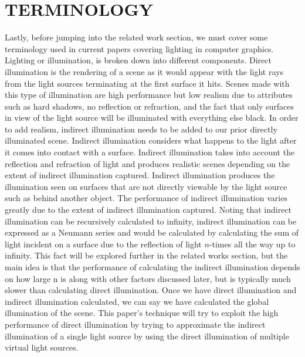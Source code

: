 \section{TERMINOLOGY}
Lastly, before jumping into the related work section, we must cover some terminology used in current papers covering lighting in computer graphics.  Lighting or illumination, is broken down into different components.  Direct illumination is the rendering of a scene as it would appear with the light rays from the light sources terminating at the first surface it hits.  Scenes made with this type of illumination are high performance but low realism due to attributes such as hard shadows, no reflection or refraction, and the fact that only surfaces in view of the light source will be illuminated with everything else black.  In order to add realism, indirect illumination needs to be added to our prior directly illuminated scene.  Indirect illumination considers what happens to the light after it comes into contact with a surface.  Indirect illumination takes into account the reflection and refraction of light and produces realistic scenes depending on the extent of indirect illumination captured.  Indirect illumination produces the illumination seen on surfaces that are not directly viewable by the light source such as behind another object.  The performance of indirect illumination varies greatly due to the extent of indirect illumination captured.  Noting that indirect illumination can be recursively calculated to infinity, indirect illumination can be expressed as a Neumann series and would be calculated by calculating the sum of light incident on a surface due to the reflection of light $n$-times all the way up to infinity.  This fact will be explored further in the related works section, but the main idea is that the performance of calculating the indirect illumination depends on how large n is along with other factors discussed later, but is typically much slower than calculating direct illumination.  Once we have direct illumination and indirect illumination calculated, we can say we have calculated the global illumination of the scene.  This paper's technique will try to exploit the high performance of direct illumination by trying to approximate the indirect illumination of a single light source by using the direct illumination of multiple virtual light sources.
